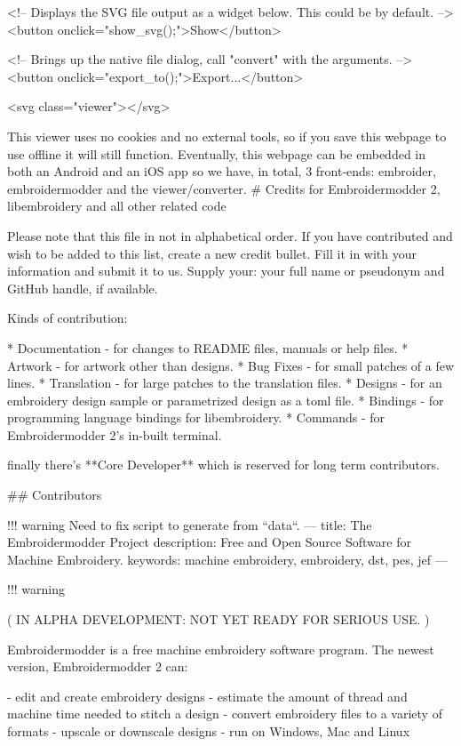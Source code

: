 <!-- Displays the SVG file output as a widget below. This could be by default. -->
<button onclick="show_svg();">Show</button>

<!-- Brings up the native file dialog, call "convert" with the arguments. -->
<button onclick="export_to();">Export...</button>

<svg class="viewer"></svg>

This viewer uses no cookies and no external tools, so if you save this webpage to use offline it will still function.
Eventually, this webpage can be embedded in both an Android and an iOS app so we have, in total, 3 front-ends: embroider,
embroidermodder and the viewer/converter.
# Credits for Embroidermodder 2, libembroidery and all other related code

Please note that this file in not in alphabetical order. If you have
contributed and wish to be added to this list, create a new credit
bullet. Fill it in with your information and submit it to us. Supply
your: your full name or pseudonym and GitHub handle, if available.

Kinds of contribution:

* Documentation - for changes to README files, manuals or help files.
* Artwork - for artwork other than designs.
* Bug Fixes - for small patches of a few lines.
* Translation - for large patches to the translation files.
* Designs - for an embroidery design sample or parametrized design as a toml file.
* Bindings - for programming language bindings for libembroidery.
* Commands - for Embroidermodder 2's in-built terminal.

finally there's **Core Developer** which is reserved for long term
contributors.

## Contributors

!!! warning
    Need to fix script to generate from ``data``.
---
title: The Embroidermodder Project
description: Free and Open Source Software for Machine Embroidery.
keywords: machine embroidery, embroidery, dst, pes, jef
---

!!! warning

    ( IN ALPHA DEVELOPMENT: NOT YET READY FOR SERIOUS USE. )

Embroidermodder is a free machine embroidery software program.
The newest version, Embroidermodder 2 can:

- edit and create embroidery designs
- estimate the amount of thread and machine time needed to stitch a design
- convert embroidery files to a variety of formats
- upscale or downscale designs
- run on Windows, Mac and Linux

